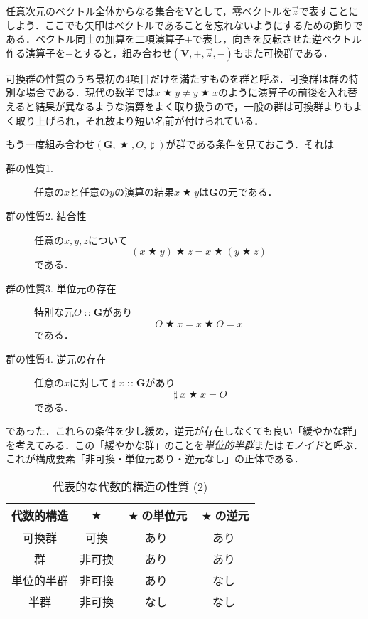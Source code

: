 \documentclass[twocolumn]{jsbook}
\newcommand{\keyword}[1]{{\emph{#1}}}
\DeclareMathOperator{\mathAnyBinaryOperator}{\bigstar}
\DeclareMathOperator{\mathIn}{:\!:}
\DeclareMathOperator{\mathInverse}{\sharp}
\newcommand{\mathSet}[1]{\mathbf{#1}} %
\newcommand{\mathVector}[1]{\vec{#1}}
\newcommand{\mathGroup}[4]{(#1,#2,#3,#4)}
\begin{document}
任意次元のベクトル全体からなる集合を$\mathSet{V}$として，零ベクトルを$\mathVector{z}$で表すことにしよう．ここでも矢印はベクトルであることを忘れないようにするための飾りである．ベクトル同士の加算を二項演算子$+$で表し，向きを反転させた逆ベクトル作る演算子を$-$とすると，組み合わせ$\mathGroup{\mathSet{V}}{+}{\mathVector{z}}{-}$もまた可換群である．

可換群の性質のうち最初の4項目だけを満たすものを群と呼ぶ．可換群は群の特別な場合である．現代の数学では$x\mathAnyBinaryOperator y\neq y\mathAnyBinaryOperator x$のように演算子の前後を入れ替えると結果が異なるような演算をよく取り扱うので，一般の群は可換群よりもよく取り上げられ，それ故より短い名前が付けられている．

もう一度組み合わせ$\mathGroup{\mathSet{G}}{\mathAnyBinaryOperator}{O}{\mathInverse}$が群である条件を見ておこう．それは
\begin{description}
\item[群の性質1.] 任意の$x$と任意の$y$の演算の結果$x\mathAnyBinaryOperator y$は$\mathSet{G}$の元である．
\item[群の性質2. 結合性] 任意の$x,y,z$について
\begin{equation}
(x\mathAnyBinaryOperator y)\mathAnyBinaryOperator z=x\mathAnyBinaryOperator(y\mathAnyBinaryOperator z)
\end{equation}
である．
\item[群の性質3. 単位元の存在] 特別な元$O\mathIn\mathSet{G}$があり
\begin{equation}
O\mathAnyBinaryOperator x=x\mathAnyBinaryOperator O=x
\end{equation}
である．
\item[群の性質4. 逆元の存在] 任意の$x$に対して$\mathInverse x\mathIn\mathSet{G}$があり
\begin{equation}
\mathInverse x\mathAnyBinaryOperator x=O
\end{equation}
である．
\end{description}
であった．これらの条件を少し緩め，逆元が存在しなくても良い「緩やかな群」を考えてみる．この「緩やかな群」のことを\keyword{単位的半群}または\keyword{モノイド}と呼ぶ．これが構成要素「非可換・単位元あり・逆元なし」の正体である．

\begin{table}
\caption{代表的な代数的構造の性質 (2)}
\label{tab:group-and-monoid}
\begin{center}
\begin{tabular}{||c||c|c|c||}
\hline
代数的構造&$\mathAnyBinaryOperator$&$\mathAnyBinaryOperator$の単位元&$\mathAnyBinaryOperator$の逆元\\
\hline\hline
可換群&可換&あり&あり\\
群&非可換&あり&あり\\
単位的半群&非可換&あり&なし\\
半群&非可換&なし&なし\\
\hline
\end{tabular}
\end{center}
\end{table}
\end{document}
